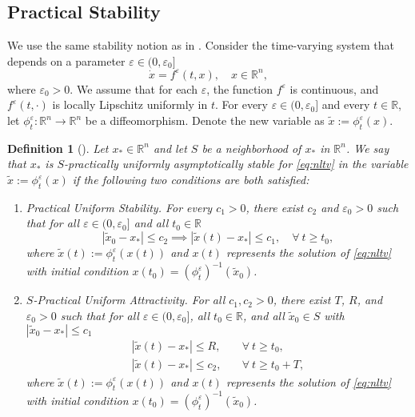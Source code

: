 \documentclass{ifacconf}
\newtheorem{definition}{Definition}
\begin{document}
\subsection{Practical Stability}

We use the same stability notion as in \cite{moreau2000practical,durr2013lie}. Consider the time-varying system that depends on a parameter $\varepsilon\in(0,\varepsilon_0]$
\begin{equation}\label{eq:nltv}
    \dot{x}=f^\varepsilon (t,x),\quad x\in\mathbb{R}^n,
\end{equation}
where $\varepsilon_0>0$. We assume that for each $ \varepsilon $, the function $ f^\varepsilon $ is continuous, and $ f^\varepsilon(t,\cdot) $ is locally Lipschitz uniformly in $ t $. For every $\varepsilon\in(0,\varepsilon_0]$ and every $t\in\mathbb{R}$, let $\phi_t^\varepsilon:\mathbb{R}^n\to \mathbb{R}^n$ be a diffeomorphism. Denote the new variable as $\tilde{x}:=\phi_t^\varepsilon(x)$.


\begin{definition}[\cite{durr2013lie}]\label{def:1} Let $x_*\in\mathbb{R}^n$ and let $S$ be a neighborhood of $x_*$ in $\mathbb{R}^n$. We say that $x_*$ is  \textit{$S$-practically uniformly asymptotically stable} for \eqref{eq:nltv} in the variable $\tilde{x}:=\phi_t^\varepsilon(x)$ if the following two conditions are both satisfied:
    \begin{enumerate}[label=(\roman*)]
        \item \textit{Practical Uniform Stability.} For every $c_1>0$, there exist $c_2$ and $\varepsilon_0>0$ such that for all $\varepsilon\in(0,\varepsilon_0]$ and all $t_0\in\mathbb{R}$
        \begin{equation*}
            |\tilde{x}_0 - x_*|\le c_2 \implies |\tilde{x}(t)-x_*|\le c_1,\quad \forall~t\ge t_0,
        \end{equation*}
        where $\tilde{x}(t):=\phi_t^\varepsilon(x(t))$ and $x(t)$ represents the solution of \eqref{eq:nltv} with initial condition $x(t_0)=\left( \phi_t^\varepsilon\right)^{-1}(\tilde{x}_0)$.
        
        \item \textit{$S$-Practical Uniform Attractivity.} For all $c_1,c_2>0$, there exist $T$, $R$, and $\varepsilon_0>0$ such that for all $\varepsilon\in(0,\varepsilon_0]$, all $t_0\in\mathbb{R}$, and all $\tilde{x}_0 \in S$ with $|\tilde{x}_0 - x_*|\le c_1$
        \begin{equation*}
            \begin{aligned}
                |\tilde{x}(t)-x_*|\le R,\quad &\forall~t\ge t_0,\\
                |\tilde{x}(t)-x_*|\le c_2,\quad &\forall~t\ge t_0 + T,
            \end{aligned}
        \end{equation*}
        where $\tilde{x}(t):=\phi_t^\varepsilon(x(t))$ and $x(t)$ represents the solution of \eqref{eq:nltv} with initial condition $x(t_0)=\left( \phi_t^\varepsilon\right)^{-1}(\tilde{x}_0)$.
    \end{enumerate}
\end{definition}
\end{document}

